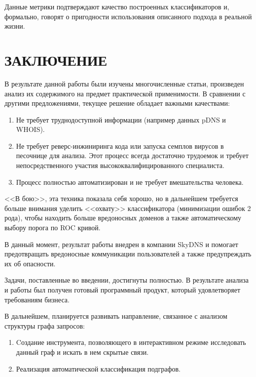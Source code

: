 \documentclass[a4paper,14pt]{extreport} %
\begin{document}
Данные метрики подтверждают качество построенных классификаторов и, формально, говорят о пригодности использования описанного подхода в реальной жизни.

\chapter*{ЗАКЛЮЧЕНИЕ}
В результате данной работы были изучены многочисленные статьи, произведен анализ их содержимого на предмет практической применимости. В сравнении с другими предложениями, текущее решение обладает важными качествами:
\begin{enumerate}
\item Не требует труднодоступной информации (например данных pDNS и WHOIS).
\item Не требует реверс-инжиниринга кода или запуска семплов вирусов в песочнице для анализа. Этот процесс всегда достаточно трудоемок и требует непосредственного участия высококвалифицированного специалиста.
\item Процесс полностью автоматизирован и не требует вмешательства человека.
\end{enumerate}


<<В бою>>, эта техника показала себя хорошо, но в дальнейшем требуется больше внимания уделить <<охвату>> классификатора (минимизации ошибок 2 рода), чтобы находить больше вредоносных доменов а также автоматическому выбору порога по ROC кривой.

В данный момент, результат работы внедрен в компании SkyDNS и помогает предотвращать вредоносные коммуникации пользователей а также предупреждать их об опасности.

Задачи, поставленные во введении, достигнуты полностью. В результате анализа и работы был получен готовый программный продукт, который удовлетворяет требованиям бизнеса. 

В дальнейшем, планируется развивать направление, связанное с анализом структуры графа запросов:
\begin{enumerate}
\item Cоздание инструмента, позволяющего в интерактивном режиме исследовать данный граф и искать в нем скрытые связи.
\item Реализация автоматической классификация подграфов.
\end{enumerate}
\end{document}
